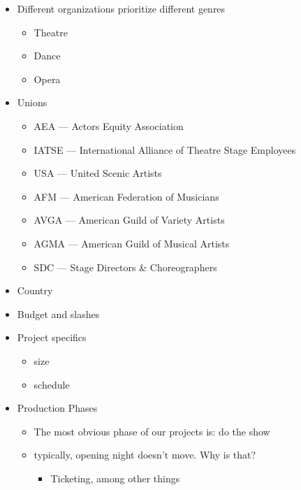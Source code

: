 \documentclass[12pt]{article}
\begin{document}
\begin{itemize}
                \item Different organizations prioritize different genres
                \begin{itemize}
                    \item Theatre
                    \item Dance
                    \item Opera
                \end{itemize}
                \item Unions
                \begin{itemize}
                    \item AEA --- Actors Equity Association
                    \item IATSE --- International Alliance of Theatre Stage Employees
                    \item USA --- United Scenic Artists
                    \item AFM --- American Federation of Musicians
                    \item AVGA --- American Guild of Variety Artists
                    \item AGMA --- American Guild of Musical Artists
                    \item SDC --- Stage Directors \& Choreographers
                \end{itemize}
                \item Country
                \item Budget and slashes
                \item Project specifics
                \begin{itemize}
                    \item size
                    \item schedule
                \end{itemize}
                \item Production Phases
                \begin{itemize}
                    \item The most obvious phase of our projects is: do the show
                    \item typically, opening night doesn't move. Why is that?
                    \begin{itemize}
                        \item Ticketing, among other things
                    \end{itemize}

\end{itemize}
\end{itemize}
\end{document}
